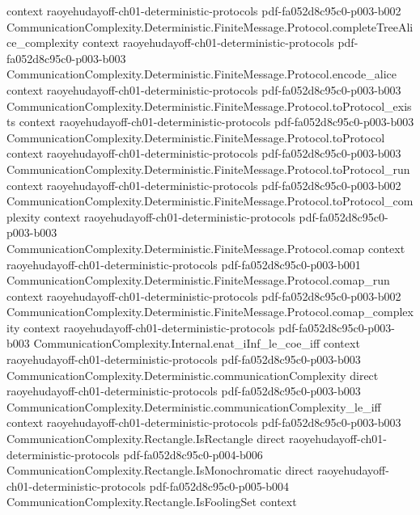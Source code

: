 \begin{theorem}
  {context}
  {raoyehudayoff-ch01-deterministic-protocols}
  {pdf-fa052d8c95c0-p003-b002}
\proofstep
  {CommunicationComplexity.Deterministic.FiniteMessage.Protocol.completeTreeAlice_complexity}
  {context}
  {raoyehudayoff-ch01-deterministic-protocols}
  {pdf-fa052d8c95c0-p003-b003}
\proofstep
  {CommunicationComplexity.Deterministic.FiniteMessage.Protocol.encode_alice}
  {context}
  {raoyehudayoff-ch01-deterministic-protocols}
  {pdf-fa052d8c95c0-p003-b003}
\proofstep
  {CommunicationComplexity.Deterministic.FiniteMessage.Protocol.toProtocol_exists}
  {context}
  {raoyehudayoff-ch01-deterministic-protocols}
  {pdf-fa052d8c95c0-p003-b003}
\proofstep
  {CommunicationComplexity.Deterministic.FiniteMessage.Protocol.toProtocol}
  {context}
  {raoyehudayoff-ch01-deterministic-protocols}
  {pdf-fa052d8c95c0-p003-b003}
\proofstep
  {CommunicationComplexity.Deterministic.FiniteMessage.Protocol.toProtocol_run}
  {context}
  {raoyehudayoff-ch01-deterministic-protocols}
  {pdf-fa052d8c95c0-p003-b002}
\proofstep
  {CommunicationComplexity.Deterministic.FiniteMessage.Protocol.toProtocol_complexity}
  {context}
  {raoyehudayoff-ch01-deterministic-protocols}
  {pdf-fa052d8c95c0-p003-b003}
\proofstep
  {CommunicationComplexity.Deterministic.FiniteMessage.Protocol.comap}
  {context}
  {raoyehudayoff-ch01-deterministic-protocols}
  {pdf-fa052d8c95c0-p003-b001}
\proofstep
  {CommunicationComplexity.Deterministic.FiniteMessage.Protocol.comap_run}
  {context}
  {raoyehudayoff-ch01-deterministic-protocols}
  {pdf-fa052d8c95c0-p003-b002}
\proofstep
  {CommunicationComplexity.Deterministic.FiniteMessage.Protocol.comap_complexity}
  {context}
  {raoyehudayoff-ch01-deterministic-protocols}
  {pdf-fa052d8c95c0-p003-b003}
\proofstep
  {CommunicationComplexity.Internal.enat_iInf_le_coe_iff}
  {context}
  {raoyehudayoff-ch01-deterministic-protocols}
  {pdf-fa052d8c95c0-p003-b003}
\proofstep
  {CommunicationComplexity.Deterministic.communicationComplexity}
  {direct}
  {raoyehudayoff-ch01-deterministic-protocols}
  {pdf-fa052d8c95c0-p003-b003}
\proofstep
  {CommunicationComplexity.Deterministic.communicationComplexity_le_iff}
  {context}
  {raoyehudayoff-ch01-deterministic-protocols}
  {pdf-fa052d8c95c0-p003-b003}
\proofstep
  {CommunicationComplexity.Rectangle.IsRectangle}
  {direct}
  {raoyehudayoff-ch01-deterministic-protocols}
  {pdf-fa052d8c95c0-p004-b006}
\proofstep
  {CommunicationComplexity.Rectangle.IsMonochromatic}
  {direct}
  {raoyehudayoff-ch01-deterministic-protocols}
  {pdf-fa052d8c95c0-p005-b004}
\proofstep
  {CommunicationComplexity.Rectangle.IsFoolingSet}
  {context}

\end{theorem}
